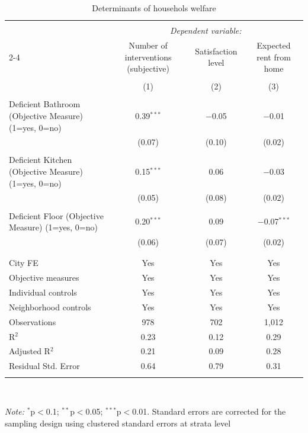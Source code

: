  \begin{table}[H] \centering    \caption{Determinants of househols welfare}    \label{reg_prod_pca}  \tiny  \begin{tabularx}{0.9\textwidth}{@{\extracolsep{-7pt}}lccc}  \\[-1.8ex]\hline  \hline \\[-1.8ex]   & \multicolumn{3}{c}{\textit{Dependent variable:}} \\  \cline{2-4}   & Number of interventions (subjective) & Satisfaction level & Expected rent from home \\  \\[-1.8ex] & (1) & (2) & (3)\\  \hline \\[-1.8ex]   Deficient Bathroom (Objective Measure) (1=yes, 0=no) & 0.39$^{***}$ & $-$0.05 & $-$0.01 \\    & (0.07) & (0.10) & (0.02) \\    & & & \\   Deficient Kitchen (Objective Measure) (1=yes, 0=no) & 0.15$^{***}$ & 0.06 & $-$0.03 \\    & (0.05) & (0.08) & (0.02) \\    & & & \\   Deficient Floor (Objective Measure) (1=yes, 0=no) & 0.20$^{***}$ & 0.09 & $-$0.07$^{***}$ \\    & (0.06) & (0.07) & (0.02) \\    & & & \\  \hline \\[-1.8ex]  City FE & Yes & Yes & Yes \\  Objective measures & Yes & Yes & Yes \\  Individual controls & Yes & Yes & Yes \\  Neighborhood controls & Yes & Yes & Yes \\  Observations & 978 & 702 & 1,012 \\  R$^{2}$ & 0.23 & 0.12 & 0.29 \\  Adjusted R$^{2}$ & 0.21 & 0.09 & 0.28 \\  Residual Std. Error & 0.64 & 0.79 & 0.31 \\  \hline  \hline \\[-1.8ex]  \end{tabularx} \\ \parbox[]{\textwidth}{\textit{Note:} $^{*}$p$<$0.1; $^{**}$p$<$0.05; $^{***}$p$<$0.01. Standard errors are corrected for the sampling design using clustered standard errors at strata level }  \end{table} 